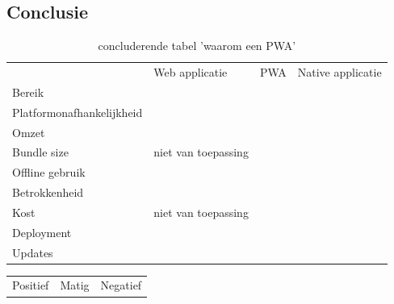 \subsection{Conclusie}
	\begin{table}[H]
		\centering
		\begin{tabular}{llll}
			                         			  & Web applicatie 	 				 & PWA								 & Native applicatie \\
			Bereik                   		   & \cellcolor{green!40}      		 & \cellcolor{green!40}			& \cellcolor{red!50}\\
			Platformonafhankelijkheid   & \cellcolor{green!40}      	  & \cellcolor{orange!50}		& \cellcolor{red!50}\\
			Omzet   						  & \cellcolor{red!50}      		 & \cellcolor{orange!50}		& \cellcolor{green!40}\\
			Bundle size						  & niet van toepassing      		& \cellcolor{green!40}		   & \cellcolor{red!50}\\
			Offline gebruik					 & \cellcolor{red!50}      		    & \cellcolor{green!40}			& \cellcolor{green!40}\\
			Betrokkenheid 					& \cellcolor{red!50}      		   & \cellcolor{orange!50}		 & \cellcolor{green!40}\\
			Kost 								& niet van toepassing     		  & \cellcolor{green!40}		 & \cellcolor{red!50}\\
			Deployment 						& \cellcolor{green!40}      	  & \cellcolor{green!40}		 & \cellcolor{red!50}\\
			Updates	   						& \cellcolor{green!40}      	  & \cellcolor{green!40}		 & \cellcolor{red!50}\\
		\end{tabular}
		\caption{concluderende tabel 'waarom een PWA'}
	\end{table}
	
	\begin{table}[H]
		\centering
		\begin{tabular}{lll}
			Positief \cellcolor{green!40} & Matig \cellcolor{orange!50} & Negatief  \cellcolor{red!50}
		\end{tabular}
	\end{table}
	
	
